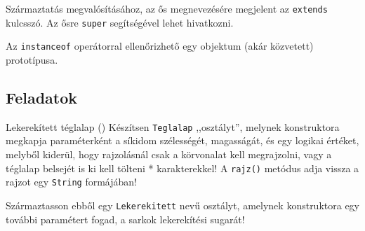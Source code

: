 \begin{frame}
    Származtatás megvalósításához, az ős megnevezésére megjelent az \texttt{extends} kulcsszó. Az ősre \texttt{super} segítségével lehet
    hivatkozni.
    \begin{exampleblock}{}
        \scriptsize
        \vspace{-.2cm}
        
        \vspace{-.2cm}
    \end{exampleblock}
\end{frame}

\begin{frame}
    \begin{exampleblock}{}
        \scriptsize
        \vspace{-.2cm}
        
        \vspace{-.2cm}
    \end{exampleblock}
\end{frame}

\begin{frame}
    \begin{exampleblock}{}
        \small
        
    \end{exampleblock}
    Az \texttt{instanceof} operátorral ellenőrizhető egy objektum (akár közvetett) prototípusa.
\end{frame}

\subsection{Feladatok}

\begin{frame}
    \begin{exampleblock}{Lekerekített téglalap ()}
        Készítsen \texttt{Teglalap} ,,osztályt'', melynek konstruktora megkapja paraméterként a síkidom szélességét, magasságát,
        és egy logikai értéket, melyből kiderül, hogy rajzolásnál csak a körvonalat kell megrajzolni, vagy a téglalap belsejét is
        ki kell tölteni * karakterekkel! A \texttt{rajz()} metódus adja vissza a rajzot egy \texttt{String} formájában!

        Származtasson ebből egy \texttt{Lekerekitett} nevű osztályt, amelynek konstruktora egy további paramétert fogad, a sarkok
        lekerekítési sugarát!
    \end{exampleblock}
\end{frame}